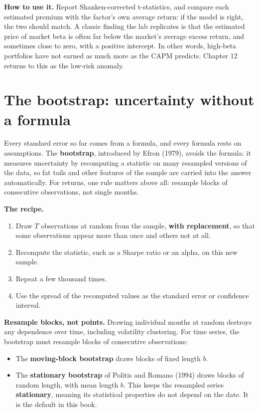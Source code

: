 \textbf{How to use it.} Report Shanken-corrected t-statistics, and compare each
estimated premium with the factor's own average return: if the model is right,
the two should match. A classic finding the lab replicates is that the
estimated price of market beta is often far below the market's average excess
return, and sometimes close to zero, with a positive intercept. In other words,
high-beta portfolios have not earned as much more as the CAPM predicts.
Chapter 12 returns to this as the low-risk anomaly.

\section{The bootstrap: uncertainty without a formula}
\label{sec:03-bootstrap}

Every standard error so far comes from a formula, and every formula rests on
assumptions. The \textbf{bootstrap}, introduced by Efron (1979), avoids the
formula: it measures uncertainty by recomputing a statistic on many resampled
versions of the data, so fat tails and other features of the sample are carried
into the answer automatically. For returns, one rule matters above all:
resample blocks of consecutive observations, not single months.

\textbf{The recipe.}

\begin{enumerate}
  \item Draw $T$ observations at random from the sample, \textbf{with replacement}, so that some observations appear more than once and others not at all.
  \item Recompute the statistic, such as a Sharpe ratio or an alpha, on this new sample.
  \item Repeat a few thousand times.
  \item Use the spread of the recomputed values as the standard error or confidence interval.
\end{enumerate}

\textbf{Resample blocks, not points.} Drawing individual months at random
destroys any dependence over time, including volatility clustering. For time
series, the bootstrap must resample blocks of consecutive observations:

\begin{itemize}
  \item The \textbf{moving-block bootstrap} draws blocks of fixed length $b$.
  \item The \textbf{stationary bootstrap} of Politis and Romano (1994) draws blocks of random length, with mean length $b$. This keeps the resampled series \textbf{stationary}, meaning its statistical properties do not depend on the date. It is the default in this book.
\end{itemize}

